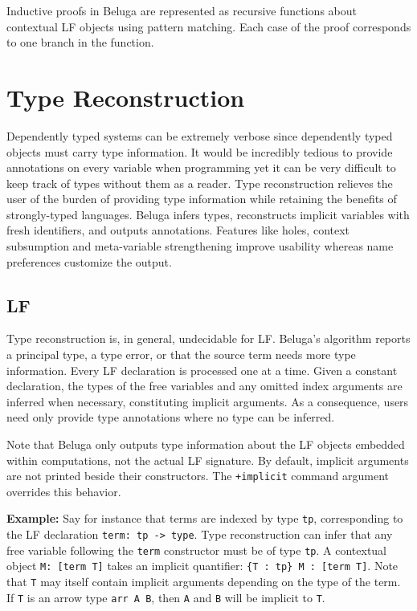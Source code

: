 \documentclass[11pt]{article}
\begin{document}
Inductive proofs in Beluga are represented as recursive functions about contextual LF objects using pattern matching.
Each case of the proof corresponds to one branch in the function.


\section{Type Reconstruction}

Dependently typed systems can be extremely verbose since dependently typed objects must carry type information.
It would be incredibly tedious to provide annotations on every variable when programming yet it can be very difficult to keep track of types without them as a reader.
Type reconstruction relieves the user of the burden of providing type information while retaining the benefits of strongly-typed languages.
Beluga infers types, reconstructs implicit variables with fresh identifiers, and outputs annotations.
Features like holes, context subsumption and meta-variable strengthening improve usability whereas name preferences customize the output.

\subsection{LF}
Type reconstruction is, in general, undecidable for LF.
Beluga's algorithm reports a principal type, a type error, or that the source term needs more type information.
Every LF declaration is processed one at a time.
Given a constant declaration, the types of the free variables and any omitted index arguments are inferred when necessary, constituting implicit arguments.
As a consequence, users need only provide type annotations where no type can be inferred.

Note that Beluga only outputs type information about the LF objects embedded within computations, not the actual LF signature.
By default, implicit arguments are not printed beside their constructors.
The \texttt{+implicit} command argument overrides this behavior.

\textbf{Example:} Say for instance that terms are indexed by type \verb+tp+, corresponding to the LF declaration \verb+term: tp -> type+.
Type reconstruction can infer that any free variable following the \verb+term+ constructor must be of type \verb+tp+.
A contextual object \verb+M: [term T]+ takes an implicit quantifier: \verb+{T : tp} M : [term T]+.
Note that \verb+T+ may itself contain implicit arguments depending on the type of the term.
If \verb+T+ is an arrow type \verb+arr A B+, then \verb+A+ and \verb+B+ will be implicit to \verb+T+.
\end{document}
